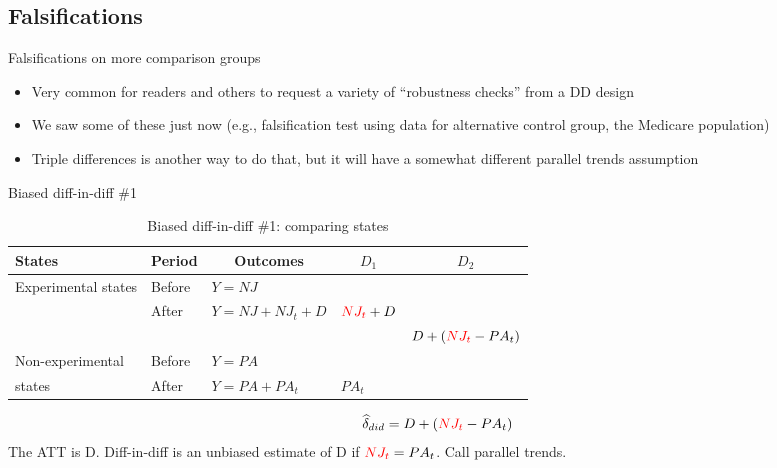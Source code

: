 \documentclass{beamer}
\begin{document}
\subsection{Falsifications}


\begin{frame}{Falsifications on more comparison groups}
	
	\begin{itemize}
	\item Very common for readers and others to request a variety of ``robustness checks'' from a DD design
	\item We saw some of these just now (e.g., falsification test using data for alternative control group, the Medicare population)
	\item Triple differences is another way to do that, but it will have a somewhat different parallel trends assumption
	\end{itemize}
\end{frame}





\begin{frame}{Biased diff-in-diff \#1}

\begin{table}\centering
\scriptsize
		\caption{Biased diff-in-diff \#1: comparing states}
		\begin{center}
		\begin{tabular}{lll|lc}
		\toprule
		\multicolumn{1}{l}{\textbf{States}}&
		\multicolumn{1}{c}{\textbf{Period}}&
		\multicolumn{1}{c}{\textbf{Outcomes}}&
		\multicolumn{1}{c}{$D_1$}&
		\multicolumn{1}{c}{$D_2$}\\
		\midrule
		Experimental states & Before & $Y=NJ$ \\
		& After & $Y=NJ + NJ_t + D$ & $\textcolor{red}{NJ_t}+D$\\
		\midrule
		& & & & $D + (\textcolor{red}{NJ_t}- PA_t)$ \\
		\midrule
		Non-experimental  & Before & $Y=PA$ \\
		states& After & $Y=PA + PA_t$ & $PA_t$\\
		\bottomrule
		\end{tabular}
		\end{center}
	\end{table}

\begin{eqnarray*}
\widehat{\delta}_{did} = D + (\textcolor{red}{NJ_t}- PA_t)
\end{eqnarray*}The ATT is D. Diff-in-diff is an unbiased estimate of D if $\textcolor{red}{NJ_t} = PA_t$. Call parallel trends.

\end{frame}
\end{document}
